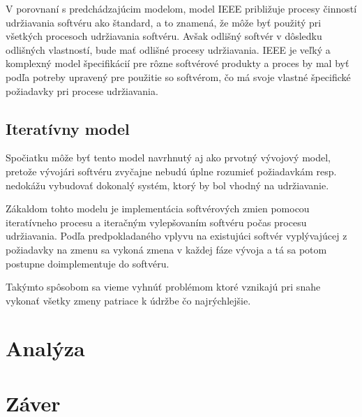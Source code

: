\documentclass[10pt,twoside,slovak,a4paper]{article}
\begin{document}
V porovnaní s predchádzajúcim modelom, model IEEE približuje procesy činností udržiavania softvéru ako štandard, a to znamená, že môže byť použitý pri všetkých procesoch udržiavania softvéru. Avšak odlišný softvér v dôsledku odlišných vlastností, bude mať odlišné procesy udržiavania. IEEE je veľký a komplexný model špecifikácií pre rôzne softvérové produkty a proces by mal byť podľa potreby upravený pre použitie so softvérom, čo má svoje vlastné špecifické požiadavky pri procese udržiavania.\cite{6116869}

\subsection{Iteratívny model} \label{modely:iterative}
Spočiatku môže byť tento model navrhnutý aj ako prvotný vývojový model, pretože vývojári softvéru zvyčajne nebudú úplne rozumieť požiadavkám resp. nedokážu vybudovať dokonalý systém, ktorý by bol vhodný na udržiavanie. \cite{6116869}

Zákaldom tohto modelu je implementácia softvérových zmien pomocou iteratívneho procesu a iteračným vylepšovaním softvéru počas procesu udržiavania. Podľa predpokladaného vplyvu na existujúci softvér vyplývajúcej z požiadavky na zmenu sa vykoná zmena v každej fáze vývoja a tá sa potom postupne doimplementuje do softvéru. \cite{6116869}

Takýmto spôsobom sa vieme vyhnúť problémom ktoré vznikajú pri snahe vykonať všetky zmeny patriace k údržbe čo najrýchlejšie.\cite{6116869}

\section{Analýza} \label{anlyza}

\section{Záver} \label{zaver} %



\end{document}

